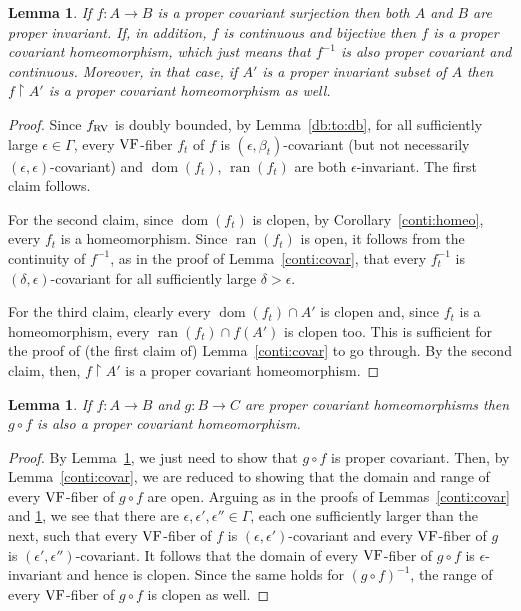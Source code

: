 \documentclass[12pt]{amsart}
\theoremstyle{plain}
\newtheorem{lem}[thm]{Lemma}
\theoremstyle{definition}
\theoremstyle{remark}
\numberwithin{equation}{section}
\theoremstyle{plain}
\newcommand{\VF}{\textup{VF}}
\newcommand{\RV}{\textup{RV}}
\DeclareMathOperator{\ran}{ran}
\DeclareMathOperator{\dom}{dom}
\newcommand{\0}{\emptyset}
\newcommand{\rest}{\upharpoonright}
\newcommand{\fun}{\longrightarrow}
\begin{document}
\begin{lem}\label{conv:unif}
If $f : A \fun B$ is a proper covariant surjection then both $A$ and $B$ are proper invariant. If, in addition, $f$ is continuous and bijective then $f$ is a proper covariant homeomorphism, which just means that $f^{-1}$ is also proper covariant and continuous. Moreover, in that case, if $A'$ is a proper invariant subset of $A$ then $f \rest A'$ is a proper covariant homeomorphism as well.
\end{lem}
\begin{proof}
Since $f_{\RV}$ is  doubly bounded, by Lemma~\ref{db:to:db}, for all sufficiently large  $\epsilon \in \Gamma$, every $\VF$-fiber $f_{t}$ of $f$ is $(\epsilon, \beta_{t})$-covariant (but not necessarily $(\epsilon, \epsilon)$-covariant) and $\dom(f_{t})$,  $\ran(f_{t})$ are both $\epsilon$-invariant. The first claim follows.

For the second claim, since $\dom(f_{t})$ is clopen, by  Corollary~\ref{conti:homeo}, every $f_t$ is a homeomorphism. Since  $\ran(f_{t})$ is open, it follows from the continuity of $f^{-1}$, as in the proof of Lemma~\ref{conti:covar}, that every  $f^{-1}_t$ is  $(\delta, \epsilon)$-covariant  for all sufficiently large $\delta > \epsilon$.

For the third claim, clearly every $\dom(f_t) \cap A'$ is   clopen and, since $f_t$ is a homeomorphism, every $\ran(f_t) \cap f(A')$ is  clopen too. This is sufficient for the proof of (the first claim of) Lemma~\ref{conti:covar} to go through. By the second claim, then, $f \rest A'$ is a proper covariant homeomorphism.
\end{proof}

\begin{lem}\label{pr:co:home:com}
If $f : A \fun B$ and $g : B  \fun C$ are proper covariant homeomorphisms then $g \circ f$ is also a proper covariant homeomorphism.
\end{lem}
\begin{proof}
By Lemma~\ref{conv:unif}, we just need to show that $g \circ f$ is proper covariant. Then, by Lemma~\ref{conti:covar}, we are reduced to showing that the domain and range of every $\VF$-fiber of $g \circ f$ are open. Arguing as in the proofs of Lemmas~\ref{conti:covar} and \ref{conv:unif}, we see that there are $\epsilon, \epsilon', \epsilon'' \in \Gamma$, each one  sufficiently larger than the next, such that every $\VF$-fiber of $f$ is $(\epsilon, \epsilon')$-covariant and every $\VF$-fiber of $g$ is $(\epsilon', \epsilon'')$-covariant. It follows that the domain of every $\VF$-fiber of $g \circ f$ is $\epsilon$-invariant and hence is clopen. Since the same holds for $(g \circ f)^{-1}$, the range of every $\VF$-fiber of $g \circ f$ is clopen as well.
\end{proof}
\end{document}
